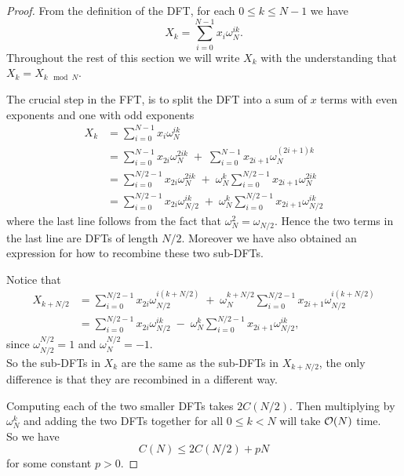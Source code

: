 \begin{proof}
From the definition of the DFT, for each $0 \le k \le N-1$ we have
\[
    X_k = \sum^{N-1}_{i=0}x_i\omega_N^{ik}.
\]
Throughout the rest of this section we will write $X_k$ with the understanding that $X_{k} = X_{k \mod N}$.

The crucial step in the FFT, is to split the DFT into a sum of $x$ terms with even exponents and one with odd exponents
\begin{align}
    X_k
    &= \sum^{N-1}_{i=0}x_i\omega_N^{ik} \nonumber\\
    &= \sum^{N-1}_{i=0}x_{2i}\omega_N^{2ik} \;+\; \sum^{N-1}_{i=0}x_{2i+1} \omega_N^{(2i+1)k} \nonumber\\
    &= \sum^{N/2-1}_{i=0}x_{2i}\omega_N^{2ik} \;+\; \omega_N^k \sum^{N/2-1}_{i=0}x_{2i+1}\omega_N^{2ik}\\
    &= \sum^{N/2-1}_{i=0}x_{2i}\omega_{N/2}^{ik} \;+\; \omega_N^k \sum^{N/2-1}_{i=0}x_{2i+1}\omega_{N/2}^{ik} \label{eq:keystep}
\end{align}
where the last line follows from the fact that $\omega_N^2 = \omega_{N/2}$. Hence the two terms in the last line are DFTs of length $N/2$. Moreover we have also obtained an expression for how to recombine these two sub-DFTs.


Notice that
\begin{align*}
    X_{k + N/2}
    &= \sum^{N/2-1}_{i=0}x_{2i}\omega_{N/2}^{i(k + N/2)} \;+\; \omega_N^{k+ N/2} \sum^{N/2-1}_{i=0}x_{2i+1}\omega_{N/2}^{i(k + N/2)}\\
    &= \sum^{N/2-1}_{i=0}x_{2i}\omega_{N/2}^{ik} \;-\; \omega_N^k \sum^{N/2-1}_{i=0}x_{2i+1}\omega_{N/2}^{ik},
\end{align*}
since $\omega_{N/2}^{N/2} = 1$ and $\omega_N^{N/2} = -1$.\\
So the sub-DFTs in $X_k$ are the same as the sub-DFTs in $X_{k + N/2}$, the only difference is that they are recombined in a different way.

Computing each of the two smaller DFTs takes $2C(N/2)$. Then multiplying by $\omega^k_N$ and adding the two DFTs together for all $0 \leq k < N$ will take $\mathcal O(N)$ time. \\
So we have
\[
    C(N) \le 2 C(N/2) + pN
\]
for some constant $p > 0$.
\end{proof}

